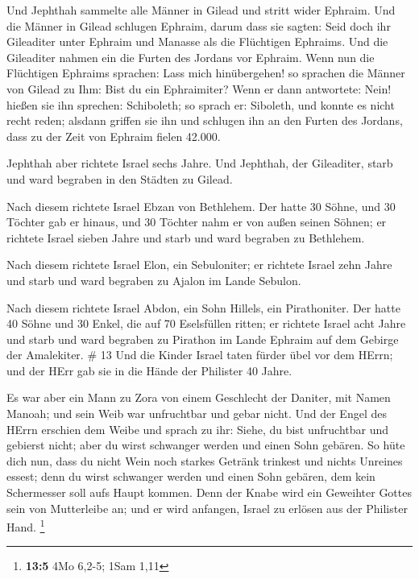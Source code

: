  Und Jephthah sammelte alle Männer in Gilead und stritt
wider Ephraim. Und die Männer in Gilead schlugen Ephraim, darum dass sie
sagten: Seid doch ihr Gileaditer unter Ephraim und Manasse als die
Flüchtigen Ephraims.  Und die Gileaditer nahmen ein die
Furten des Jordans vor Ephraim. Wenn nun die Flüchtigen Ephraims
sprachen: Lass mich hinübergehen! so sprachen die Männer von Gilead zu
Ihm: Bist du ein Ephraimiter? Wenn er dann antwortete: Nein!
 hießen sie ihn sprechen: Schiboleth; so sprach er:
Siboleth, und konnte es nicht recht reden; alsdann griffen sie ihn und
schlugen ihn an den Furten des Jordans, dass zu der Zeit von Ephraim
fielen 42.000.

 Jephthah aber richtete Israel sechs Jahre. Und Jephthah,
der Gileaditer, starb und ward begraben in den Städten zu Gilead.

 Nach diesem richtete Israel Ebzan von Bethlehem.
 Der hatte 30 Söhne, und 30 Töchter gab er hinaus, und 30
Töchter nahm er von außen seinen Söhnen; er richtete Israel sieben Jahre
 und starb und ward begraben zu Bethlehem.

 Nach diesem richtete Israel Elon, ein Sebuloniter; er
richtete Israel zehn Jahre  und starb und ward begraben zu
Ajalon im Lande Sebulon.

 Nach diesem richtete Israel Abdon, ein Sohn Hillels, ein
Pirathoniter.  Der hatte 40 Söhne und 30 Enkel, die auf 70
Eselsfüllen ritten; er richtete Israel acht Jahre  und
starb und ward begraben zu Pirathon im Lande Ephraim auf dem Gebirge der
Amalekiter. \# 13  Und die Kinder Israel taten fürder übel
vor dem HErrn; und der HErr gab sie in die Hände der Philister 40 Jahre.

 Es war aber ein Mann zu Zora von einem Geschlecht der
Daniter, mit Namen Manoah; und sein Weib war unfruchtbar und gebar
nicht.  Und der Engel des HErrn erschien dem Weibe und
sprach zu ihr: Siehe, du bist unfruchtbar und gebierst nicht; aber du
wirst schwanger werden und einen Sohn gebären.  So hüte dich
nun, dass du nicht Wein noch starkes Getränk trinkest und nichts
Unreines essest;  denn du wirst schwanger werden und einen
Sohn gebären, dem kein Schermesser soll aufs Haupt kommen. Denn der
Knabe wird ein Geweihter Gottes sein von Mutterleibe an; und er wird
anfangen, Israel zu erlösen aus der Philister Hand. \footnote{\textbf{13:5}
  4Mo 6,2-5; 1Sam 1,11}

